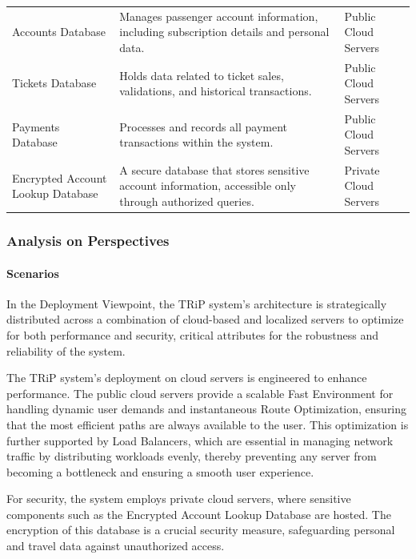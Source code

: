 \begin{table}[H]
\begin{tabularx}{\textwidth}{@{}lXX@{}}
    Accounts Database & Manages passenger account information, including subscription details and personal data. & Public Cloud Servers \\
    Tickets Database & Holds data related to ticket sales, validations, and historical transactions. & Public Cloud Servers \\
    Payments Database & Processes and records all payment transactions within the system. & Public Cloud Servers \\
    Encrypted Account Lookup Database & A secure database that stores sensitive account information, accessible only through authorized queries. & Private Cloud Servers \\
    \bottomrule
    \end{tabularx}
\end{table}
\subsubsection{Analysis on Perspectives}

\paragraph{Scenarios}


In the Deployment Viewpoint, the TRiP system's architecture is strategically distributed across a combination of cloud-based and localized servers to optimize for both performance and security, critical attributes for the robustness and reliability of the system.

The TRiP system's deployment on cloud servers is engineered to enhance performance. The public cloud servers provide a scalable Fast Environment for handling dynamic user demands and instantaneous Route Optimization, ensuring that the most efficient paths are always available to the user. This optimization is further supported by Load Balancers, which are essential in managing network traffic by distributing workloads evenly, thereby preventing any server from becoming a bottleneck and ensuring a smooth user experience. 

For security, the system employs private cloud servers, where sensitive components such as the Encrypted Account Lookup Database are hosted. The encryption of this database is a crucial security measure, safeguarding personal and travel data against unauthorized access. 
